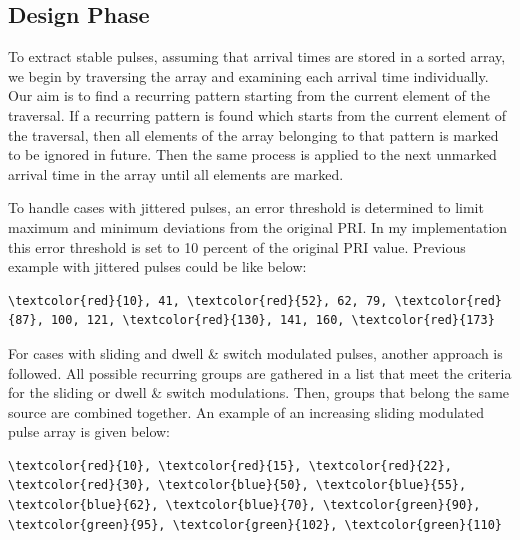 \documentclass[12pt]{report}
\begin{document}
        \subsection{Design Phase}
            
            To extract stable pulses, assuming  that arrival times are stored in a sorted array, we begin by traversing the array and examining each arrival time individually. Our aim is to find a recurring pattern starting 
            from the current element of the traversal. If a recurring pattern is found which starts from the current element of the traversal, then all elements of the array belonging to that pattern is marked to be ignored in future.
            Then the same process is applied to the next unmarked arrival time in the array until all elements are marked. \newline

            To handle cases with jittered pulses, an error threshold is determined to limit maximum and minimum deviations from the original PRI. In my implementation this error threshold is set to 10 percent of the original PRI value.
            Previous example with jittered pulses could be like below:

            \begin{Verbatim}[commandchars=\\\{\}]
                \textcolor{red}{10}, 41, \textcolor{red}{52}, 62, 79, \textcolor{red}{87}, 100, 121, \textcolor{red}{130}, 141, 160, \textcolor{red}{173} 
            \end{Verbatim}
            \bigskip 

            For cases with sliding and dwell \& switch modulated pulses, another approach is followed. All possible recurring groups are gathered in a list that meet the criteria for the sliding or dwell \& switch modulations.
            Then, groups that belong the same source are combined together. An example of an increasing sliding modulated pulse array is given below:

            \begin{Verbatim}[commandchars=\\\{\}]
                \textcolor{red}{10}, \textcolor{red}{15}, \textcolor{red}{22}, \textcolor{red}{30}, \textcolor{blue}{50}, \textcolor{blue}{55}, \textcolor{blue}{62}, \textcolor{blue}{70}, \textcolor{green}{90}, \textcolor{green}{95}, \textcolor{green}{102}, \textcolor{green}{110} 
            \end{Verbatim}
            \bigskip 
\end{document}
